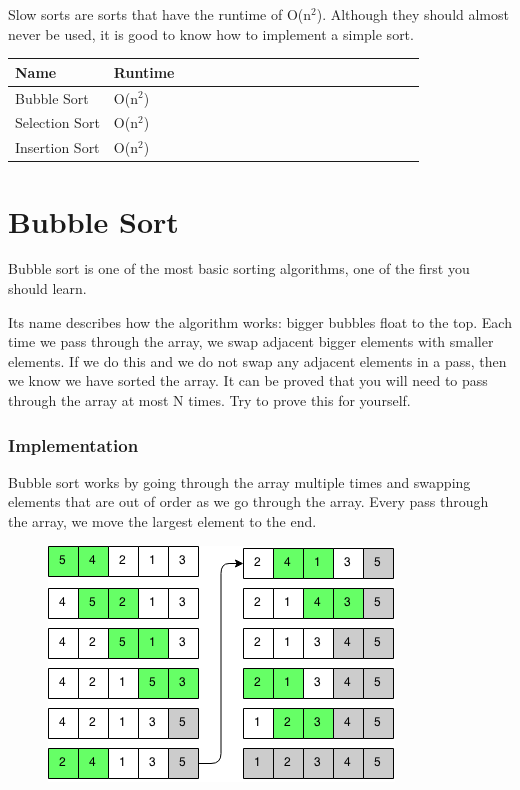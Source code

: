 \documentclass[11pt,oneside]{book}
\makeatletter
\def\maxwidth#1{\ifdim\Gin@nat@width>#1 #1\else\Gin@nat@width\fi}
\makeatother
\begin{document}
Slow sorts are sorts that have the runtime of O(n$^{2}$). Although they should almost never be used, it is good to know how to implement a simple sort.

\vspace{10px}\begin{tabulary}{0.4\linewidth}{|l|l|l|l|l|l|l|l|l|l|l|l|l|l|l|l|l|l|l}\hline


  Name &
  Runtime\\
\hline


  Bubble Sort &
  O(n$^{2}$)\\

  Selection Sort &
  O(n$^{2}$)\\

  Insertion Sort &
  O(n$^{2}$)\\

\hline\end{tabulary}


        \section{ Bubble Sort }
        

Bubble sort is one of the most basic sorting algorithms, one of the first you should learn.

Its name describes how the algorithm works: bigger bubbles float to the top. Each time we pass through the array, we swap adjacent bigger elements with smaller elements. If we do this and we do not swap any adjacent elements in a pass, then we know we have sorted the array. It can be proved that you will need to pass through the array at most N times. Try to prove this for yourself.

\subsubsection{Implementation}

Bubble sort works by going through the array multiple times and swapping elements that are out of order as we go through the array. Every pass through the array, we move the largest element to the end.

\vspace{5px}\begin{figure}[H]\centering
        \includegraphics[width=0.66\maxwidth{\textwidth}]{bubble_sort.png}
        \end{figure}
\end{document}

